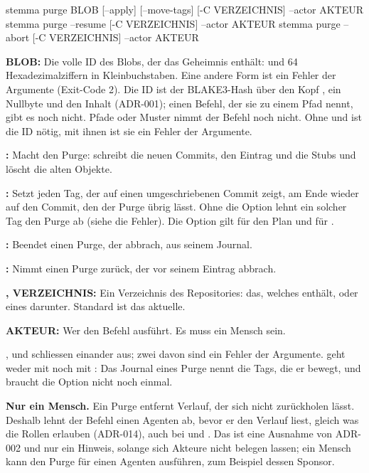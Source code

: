 \starttyping
stemma purge BLOB [--apply] [--move-tags] [-C VERZEICHNIS] --actor AKTEUR
stemma purge --resume [-C VERZEICHNIS] --actor AKTEUR
stemma purge --abort [-C VERZEICHNIS] --actor AKTEUR
\stoptyping

\startitemize
\item {\bf BLOB:} Die volle ID des Blobs, der das Geheimnis enthält:  und
64 Hexadezimalziffern in Kleinbuchstaben. Eine andere Form ist ein Fehler der Argumente
(Exit-Code 2). Die ID ist der BLAKE3-Hash über den Kopf , ein Nullbyte
und den Inhalt (ADR-001); einen Befehl, der sie zu einem Pfad nennt, gibt es noch nicht.
Pfade oder Muster nimmt der Befehl noch nicht. Ohne  und
 ist die ID nötig, mit ihnen ist sie ein Fehler der Argumente.
\item {\bf {}:} Macht den Purge: schreibt die neuen Commits, den Eintrag
 und die Stubs und löscht die alten Objekte.
\item {\bf {}:} Setzt jeden Tag, der auf einen umgeschriebenen Commit zeigt,
am Ende wieder auf den Commit, den der Purge übrig lässt. Ohne die Option lehnt ein solcher Tag
den Purge ab (siehe die Fehler). Die Option gilt für den Plan und für .
\item {\bf {}:} Beendet einen Purge, der abbrach, aus seinem Journal.
\item {\bf {}:} Nimmt einen Purge zurück, der vor seinem Eintrag abbrach.
\item {\bf {},  VERZEICHNIS:} Ein Verzeichnis des Repositories:
das, welches  enthält, oder eines darunter. Standard ist das aktuelle.
\item {\bf {} AKTEUR:} Wer den Befehl ausführt. Es muss ein Mensch sein.
\stopitemize

,  und  schliessen einander aus; zwei davon sind
ein Fehler der Argumente.  geht weder mit  noch mit
: Das Journal eines Purge nennt die Tags, die er bewegt, und 
braucht die Option nicht noch einmal.

{\bf Nur ein Mensch.} Ein Purge entfernt Verlauf, der sich nicht zurückholen lässt.
Deshalb lehnt der Befehl einen Agenten ab, bevor er den Verlauf liest, gleich was die Rollen
erlauben (ADR-014), auch bei  und . Das ist eine Ausnahme von
ADR-002 und nur ein Hinweis, solange sich Akteure nicht belegen lassen; ein Mensch kann den
Purge für einen Agenten ausführen, zum Beispiel dessen Sponsor.

